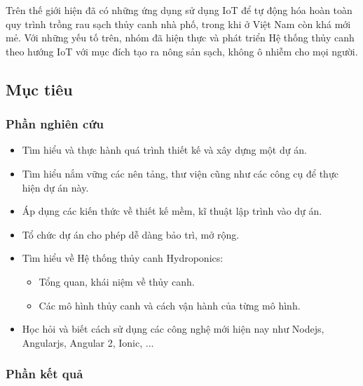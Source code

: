\documentclass[a4paper,12pt,oneside]{article}
\begin{document}
\noindent Trên thế giới hiện đã có những ứng dụng sử dụng IoT để tự động hóa hoàn toàn quy trình trồng rau sạch thủy canh nhà phố, trong khi ở Việt Nam còn khá mới mẻ. Với những yếu tố trên, nhóm đã hiện thực và phát triển Hệ thống thủy canh theo hướng IoT với mục đích tạo ra nông sản sạch, không ô nhiễm cho mọi người.


\subsection{Mục tiêu}
\subsubsection{Phần nghiên cứu}
\begin{itemize}
\item Tìm hiểu và thực hành quá trình thiết kế và xây dựng một dự án.
\item Tìm hiểu nắm vững các nên tảng, thư viện cũng như các công cụ để thực hiện dự án này.
\item Áp dụng các kiến thức về thiết kế mềm, kĩ thuật lập trình vào dự án.
\item Tổ chức dự án cho phép dễ dàng bảo trì, mở rộng.
\item Tìm hiểu về Hệ thống thủy canh Hydroponics: 
	\begin{itemize}
	\item Tổng quan, khái niệm về thủy canh.
	\item Các mô hình thủy canh và cách vận hành của từng mô hình.
	\end{itemize}
\item Học hỏi và biết cách sử dụng các công nghệ mới hiện nay như Nodejs, Angularjs, Angular 2, Ionic, ...
\end{itemize}

\subsubsection{Phần kết quả}
\end{document}
